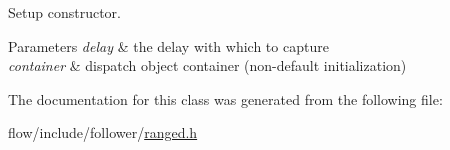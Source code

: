 Setup constructor. 


\begin{DoxyParams}{Parameters}
{\em delay} & the delay with which to capture \\
\hline
{\em container} & dispatch object container (non-\/default initialization) \\
\hline
\end{DoxyParams}


The documentation for this class was generated from the following file\+:\begin{DoxyCompactItemize}
\item 
flow/include/follower/\hyperlink{ranged_8h}{ranged.\+h}\end{DoxyCompactItemize}
